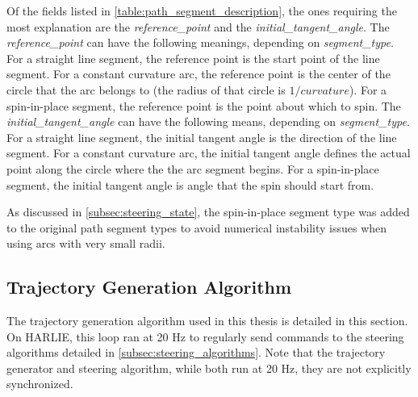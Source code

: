 Of the fields listed in \autoref{table:path_segment_description}, the ones requiring the most explanation are the \emph{reference\_point} and the \emph{initial\_tangent\_angle}. The \emph{reference\_point} can have the following meanings, depending on \emph{segment\_type}. For a straight line segment, the reference point is the start point of the line segment. For a constant curvature arc, the reference point is the center of the circle that the arc belongs to (the radius of that circle is $1/curvature$). For a spin-in-place segment, the reference point is the point about which to spin. The \emph{initial\_tangent\_angle} can have the following means, depending on \emph{segment\_type}. For a straight line segment, the initial tangent angle is the direction of the line segment. For a constant curvature arc, the initial tangent angle defines the actual point along the circle where the the arc segment begins. For a spin-in-place segment, the initial tangent angle is angle that the spin should start from.

As discussed in \autoref{subsec:steering_state}, the spin-in-place segment type was added to the original path segment types to avoid numerical instability issues when using arcs with very small radii.

\subsection{Trajectory Generation Algorithm}\label{subsec:trajectory_generation_algorithm}

The trajectory generation algorithm used in this thesis is detailed in this section. On HARLIE, this loop ran at 20 Hz to regularly send commands to the steering algorithms detailed in \autoref{subsec:steering_algorithms}. Note that the trajectory generator and steering algorithm, while both run at 20 Hz, they are not explicitly synchronized.

